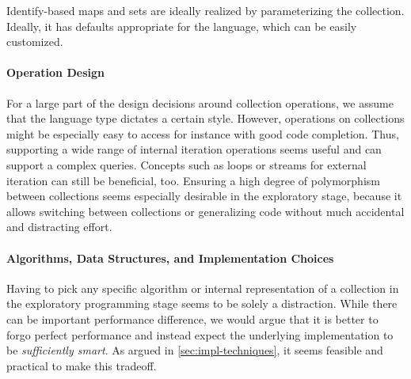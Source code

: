 \documentclass[sigconf, 10pt]{acmart}
\begin{document}
Identify-based maps and sets are ideally realized
by parameterizing the collection.
Ideally, it has defaults appropriate for the language,
which can be easily customized.

\paragraph{Operation Design}

For a large part of the design decisions around collection operations,
we assume that the language type dictates a certain style.
However, operations on collections might be especially easy to access
for instance with good code completion.
Thus, supporting a wide range of internal iteration operations seems useful
and can support a complex queries.
Concepts such as loops or streams for external iteration
can still be beneficial, too.
%
Ensuring a high degree of polymorphism between collections
seems especially desirable in the exploratory stage,
because it allows switching between collections or generalizing code
without much accidental and distracting effort.

\paragraph{Algorithms, Data Structures, and Implementation Choices}

Having to pick any specific algorithm or internal representation of a collection
in the exploratory programming stage seems to be solely a distraction.
While there can be important performance difference,
we would argue that it is better to forgo perfect performance
and instead expect the underlying implementation
to be \emph{sufficiently smart}.
As argued in \cref{sec:impl-techniques},
it seems feasible and practical to make this tradeoff.
\end{document}
